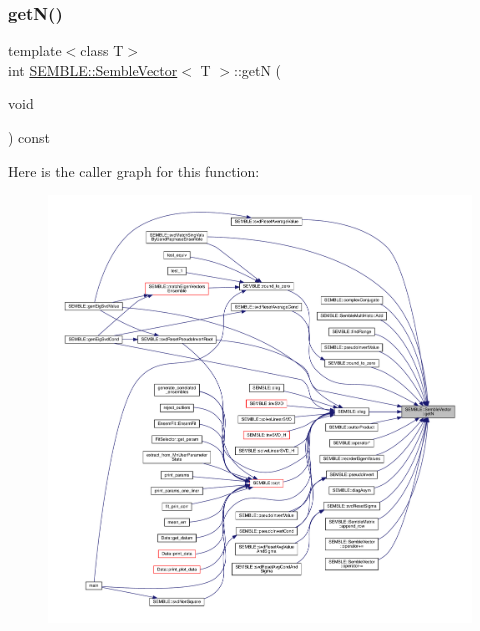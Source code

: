 \mbox{\label{structSEMBLE_1_1SembleVector_aef7c2b90fc42f7d3a9dadf6e00f18add}} 
\subsubsection{\texorpdfstring{getN()}{getN()}\hspace{0.1cm}{\footnotesize\ttfamily [1/2]}}
{\footnotesize\ttfamily template$<$class T$>$ \\
int \mbox{\hyperlink{structSEMBLE_1_1SembleVector}{S\+E\+M\+B\+L\+E\+::\+Semble\+Vector}}$<$ T $>$\+::getN (\begin{DoxyParamCaption}\item[{void}]{ }\end{DoxyParamCaption}) const\hspace{0.3cm}{\ttfamily [inline]}}

Here is the caller graph for this function\+:
\nopagebreak
\begin{figure}[H]
\begin{center}
\leavevmode
\includegraphics[width=350pt]{d9/d94/structSEMBLE_1_1SembleVector_aef7c2b90fc42f7d3a9dadf6e00f18add_icgraph}
\end{center}
\end{figure}
\mbox{\label{structSEMBLE_1_1SembleVector_aef7c2b90fc42f7d3a9dadf6e00f18add}} 
